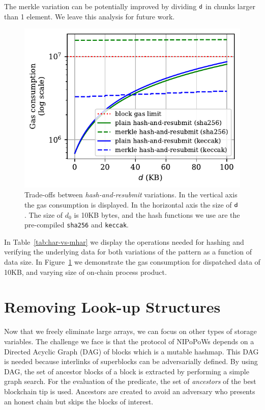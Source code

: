 

The merkle variation can be potentially improved by dividing $\mathsf{d}$ in
chunks larger than 1 element. We leave this analysis for future work.

\begin{figure}[H]
    \begin{center}
        \includegraphics[width=0.5\columnwidth]{figures/har-vs-mhar.pdf}
    \end{center}
    \caption{Trade-offs between \emph{hash-and-resubmit} variations. In the
    vertical axis the gas consumption is displayed. In the horizontal axis the
    size of $\mathsf{d}$. The size of $d_0$ is 10KB bytes, and the hash functions we
    use are the pre-compiled \texttt{sha256} and \texttt{keccak}.}
    \label{fig:har-vs-mhar}
\end{figure}


In Table~\ref{tab:har-vs-mhar} we display the operations needed for hashing and
verifying the underlying data for both variations of the pattern as a function
of data size. In Figure~\ref{fig:har-vs-mhar} we demonstrate the gas
consumption for dispatched data of 10KB, and varying size of on-chain
process product.



\section{Removing Look-up Structures}

Now that we freely eliminate large arrays, we can focus on other
types of storage variables. The challenge we face is that the protocol of
NIPoPoWs depends on a Directed Acyclic Graph (DAG) of blocks which is a
mutable hashmap. This DAG is needed because interlinks of superblocks can be
adversarially defined. By using DAG, the set of ancestor blocks of a block is
extracted by performing a simple graph search. For the evaluation of the
predicate, the set of \emph{ancestors} of the best blockchain tip is used.
Ancestors are created to avoid an adversary who presents an honest chain but
skips the blocks of interest.

